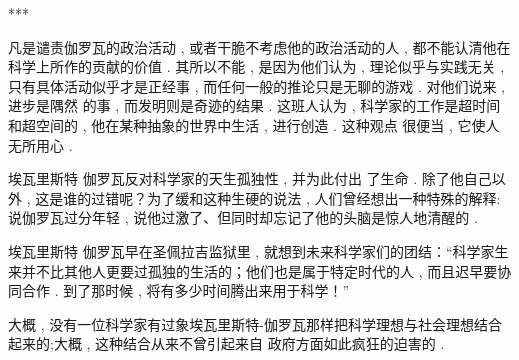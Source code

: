 \begin{center}***
\end{center}

凡是谴责伽罗瓦的政治活动 , 或者干脆不考虑他的政治活动的人 , 都不能认清他在科学上所作的贡献的价值 . 其所以不能 , 是因为他们认为 , 理论似乎与实践无关 , 只有具体活动似乎才是正经事 , 而任何一般的推论只是无聊的游戏 . 对他们说来 , 进步是隅然 的事 , 而发明则是奇迹的结果 . 这班人认为 , 科学家的工作是超时间和超空间的 , 他在某种抽象的世界中生活 , 进行创造 . 这种观点 很便当 , 它使人无所用心 . 

埃瓦里斯特 \textbullet 伽罗瓦反对科学家的天生孤独性 , 并为此付出 了生命 . 除了他自己以外 , 这是谁的过错呢？为了缓和这种生硬的说法 , 人们曾经想出一种特殊的解释:说伽罗瓦过分年轻 , 说他过激了、但同时却忘记了他的头脑是惊人地清醒的 . 

埃瓦里斯特 \textbullet 伽罗瓦早在圣佩拉吉监狱里 , 就想到未来科学家们的团结：“科学家生来并不比其他人更要过孤独的生活的；他们也是属于特定时代的人 , 而且迟早要协同合作 . 到了那时候 , 将有多少时间腾出来用于科学！”

大概 , 没有一位科学家有过象埃瓦里斯特-伽罗瓦那样把科学理想与社会理想结合起来的;大概 , 这种结合从来不曾引起来自 政府方面如此疯狂的迫害的 . 